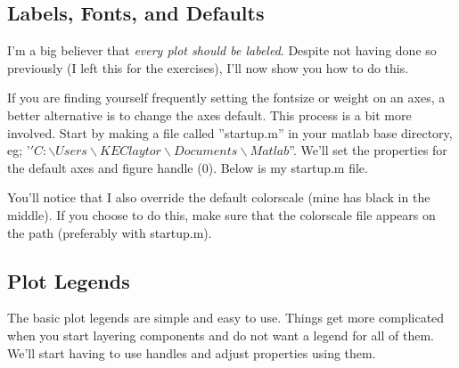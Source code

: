 \begin{quote}

\end{quote}

\pagebreak
\subsection{Labels, Fonts, and Defaults}
I'm a big believer that \emph{every plot should be labeled}.
 Despite not having done so previously (I left this for the exercises), I'll now show you how to do this.

\begin{quote}

\end{quote}

If you are finding yourself frequently setting the fontsize or weight on an axes, a better alternative is to change the axes default.
 This process is a bit more involved.
 Start by making a file called ''startup.m'' in your matlab base directory, eg; '$'C:\backslash Users\backslash KEClaytor\backslash Documents\backslash Matlab$''.
 We'll set the properties for the default axes and figure handle (0).
 Below is my startup.m file.
 
\noindent You'll notice that I also override the default colorscale (mine has black in the middle).
 If you choose to do this, make sure that the colorscale file appears on the path (preferably with startup.m).

\pagebreak
\subsection{Plot Legends}
The basic plot legends are simple and easy to use.
 Things get more complicated when you start layering components and do not want a legend for all of them.
 We'll start having to use handles and adjust properties using them.

\begin{quote}

\end{quote}
